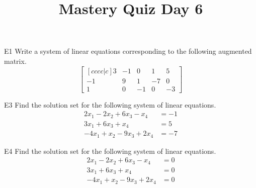 \documentclass{sbgLAquiz}
\title{Mastery Quiz Day 6 }
\begin{document}
\begin{problem}{E1}
Write a system of linear equations corresponding to the following
augmented matrix.
\[
\begin{bmatrix}[cccc|c]
3 & -1 & 0 & 1 & 5 \\
-1 & 9 & 1 & -7 & 0 \\
1 & 0 & -1 & 0 & -3
\end{bmatrix}
\]
\end{problem}

\begin{problem}{E3}
Find the solution set for the following system of linear equations.
\begin{align*}
2x_1-2x_2+6x_3-x_4 &=-1 \\
3x_1+6x_3+x_4 &= 5 \\
-4x_1+x_2-9x_3+2x_4&=-7
\end{align*}
\end{problem}
\newpage

\begin{problem}{E4}
Find the solution set for the following system of linear equations.
\begin{align*}
2x_1-2x_2+6x_3-x_4 &=0 \\
3x_1+6x_3+x_4 &=0 \\
-4x_1+x_2-9x_3+2x_4&=0
\end{align*}
\end{problem}
\end{document}
